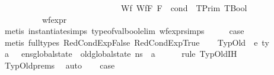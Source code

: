 \begin{isabellebody}
\ \ \ \ \ \ \ \ \ \ \ \ \ \ \ \ \ \ \ \ \ \ \ \ \ \ \ \ \ Wf{\isacharunderscore}{\kern0pt}{\isasymGamma}\ Wf{\isacharunderscore}{\kern0pt}F\ {\isacartoucheopen}F{\isacharcomma}{\kern0pt}{\isasymDelta}\ {\isasymturnstile}\ cond\ {\isacharcolon}{\kern0pt}\ TPrim\ TBool{\isacartoucheclose}{\isacharbrackright}{\kern0pt}\isanewline
\ \ \ \ \ \ \ \ \ \ {\isacartoucheopen}wf{\isacharunderscore}{\kern0pt}expr\ {\isacharunderscore}{\kern0pt}\ {\isacharunderscore}{\kern0pt}{\isacartoucheclose}\isanewline
\ \ \ \ \isamarkupfalse%
\ {\isacharparenleft}{\kern0pt}metis\ instantiate{\isachardot}{\kern0pt}simps{\isacharparenleft}{\kern0pt}{}{\isacharparenright}{\kern0pt}\ type{\isacharunderscore}{\kern0pt}of{\isacharunderscore}{\kern0pt}val{\isacharunderscore}{\kern0pt}bool{\isacharunderscore}{\kern0pt}elim\ wf{\isacharunderscore}{\kern0pt}expr{\isachardot}{\kern0pt}simps{\isacharparenleft}{\kern0pt}{}{\isacharparenright}{\kern0pt}{\isacharparenright}{\kern0pt}\isanewline
\isanewline
\ \ \isamarkupfalse%
\ \isamarkupfalse%
\ {\isacharquery}{\kern0pt}case\isanewline
\ \ \ \ \isamarkupfalse%
\ {\isacharparenleft}{\kern0pt}metis\ {\isacharparenleft}{\kern0pt}full{\isacharunderscore}{\kern0pt}types{\isacharparenright}{\kern0pt}\ RedCondExpFalse\ RedCondExpTrue{\isacharparenright}{\kern0pt}\isanewline
{}\isamarkupfalse%
\isanewline
\ \ \isamarkupfalse%
\ {\isacharparenleft}{\kern0pt}TypOld\ {\isasymDelta}\ e\ ty{\isacharparenright}{\kern0pt}\isanewline
\ \ \isamarkupfalse%
\ {\isachardoublequoteopen}{\isasymexists}a{\isachardot}{\kern0pt}\ {\isasymLambda}{\isacharcomma}{\kern0pt}{\isasymGamma}{\isacharcomma}{\kern0pt}{\isasymOmega}\ {\isasymturnstile}\ {\isasymlangle}e{\isacharcomma}{\kern0pt}n{\isacharunderscore}{\kern0pt}s{\isasymlparr}global{\isacharunderscore}{\kern0pt}state\ {\isacharcolon}{\kern0pt}{\isacharequal}{\kern0pt}\ old{\isacharunderscore}{\kern0pt}global{\isacharunderscore}{\kern0pt}state\ n{\isacharunderscore}{\kern0pt}s{\isasymrparr}{\isasymrangle}\ {\isasymDown}\ a{\isachardoublequoteclose}\isanewline
\ \ \ \ \isamarkupfalse%
\ {\isacharparenleft}{\kern0pt}rule\ TypOld{\isachardot}{\kern0pt}IH{\isacharparenright}{\kern0pt}\isanewline
\ \ \ \ \isamarkupfalse%
\ TypOld{\isachardot}{\kern0pt}prems\ \isamarkupfalse%
\ auto\isanewline
\ \ \isamarkupfalse%
\ {\isacharquery}{\kern0pt}case\isanewline
\ \ \ \ \isamarkupfalse%

\end{isabellebody}
